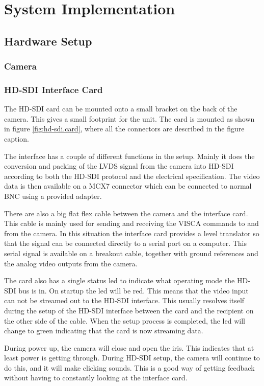 
\chapter{System Implementation}


\section{Hardware Setup}

\subsection{Camera}

\subsection{HD-SDI Interface Card}
The HD-SDI card can be mounted onto a small bracket on the back of the camera. This gives a small 
footprint for the unit. The card is mounted as shown in figure \ref{fig:hd-sdi.card}, where all the connectors are described in 
the figure caption.

The interface has a couple of different functions in the setup. Mainly it does the conversion and 
packing of the LVDS signal from the camera into HD-SDI according to both the HD-SDI protocol and the electrical specification. 
The video data is then available on a MCX7 connector which can be connected to normal BNC using a provided adapter.

There are also a big flat flex cable between the camera and the interface card. This cable is mainly used for sending and receiving the VISCA commands 
to and from the camera. In this situation the interface card provides a level translator so that the signal can be connected directly to a serial 
port on a computer. This serial signal is available on a breakout cable, together with ground references and the analog video outputs from the camera. 

The card also has a single status led to indicate what operating mode the HD-SDI bus is in. On startup the led will be red. This means that 
the video input can not be streamed out to the HD-SDI interface. This usually resolves itself during the setup of the HD-SDI interface between the 
card and the recipient on the other side of the cable. When the setup process is completed, the led will change to green indicating that 
the card is now streaming data. 

During power up, the camera will close and open the iris. This indicates that at least power is getting through. During HD-SDI setup, the camera 
will continue to do this, and it will make clicking sounds. This is a good way of getting feedback without having to constantly 
looking at the interface card.

